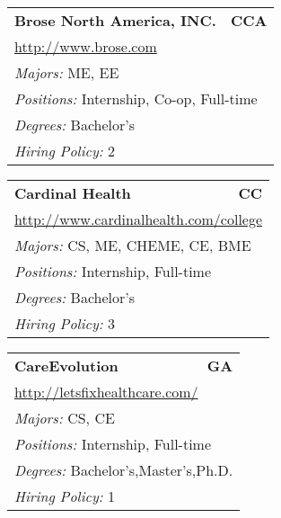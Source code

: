 \documentclass[twoside]{article}
\begin{document}
\begin{center}
\begin{multicols}{3}
\begin{FlushLeft}
\begin{minipage}{.9\columnwidth}
\end{minipage}
 
\begin{minipage}{.9\columnwidth}\begin{tabularx}{.95\columnwidth}{Xr}
                 {\Large\bf Brose North America, INC.} & {\Large\bf CCA}\\
    \multicolumn{2}{p{.95\columnwidth}}{\url{http://www.brose.com}}\\
    \multicolumn{2}{p{.95\columnwidth}}{\emph{Majors:} ME, EE}\\
    \multicolumn{2}{p{.95\columnwidth}}{\emph{Positions:} Internship, Co-op, Full-time}\\
    \multicolumn{2}{p{.95\columnwidth}}{\emph{Degrees:} Bachelor's}\\
    \multicolumn{2}{p{.95\columnwidth}}{\emph{Hiring Policy:} 2}\\
    \end{tabularx}
    
\end{minipage}
 
\begin{minipage}{.9\columnwidth}\begin{tabularx}{.95\columnwidth}{Xr}
                 {\Large\bf Cardinal Health} & {\Large\bf CC}\\
    \multicolumn{2}{p{.95\columnwidth}}{\url{http://www.cardinalhealth.com/college}}\\
    \multicolumn{2}{p{.95\columnwidth}}{\emph{Majors:} CS, ME, CHEME, CE, BME}\\
    \multicolumn{2}{p{.95\columnwidth}}{\emph{Positions:} Internship, Full-time}\\
    \multicolumn{2}{p{.95\columnwidth}}{\emph{Degrees:} Bachelor's}\\
    \multicolumn{2}{p{.95\columnwidth}}{\emph{Hiring Policy:} 3}\\
    \end{tabularx}
    
\end{minipage}
 
\begin{minipage}{.9\columnwidth}\begin{tabularx}{.95\columnwidth}{Xr}
                 {\Large\bf CareEvolution} & {\Large\bf GA}\\
    \multicolumn{2}{p{.95\columnwidth}}{\url{http://letsfixhealthcare.com/}}\\
    \multicolumn{2}{p{.95\columnwidth}}{\emph{Majors:} CS, CE}\\
    \multicolumn{2}{p{.95\columnwidth}}{\emph{Positions:} Internship, Full-time}\\
    \multicolumn{2}{p{.95\columnwidth}}{\emph{Degrees:} Bachelor's,Master's,Ph.D.}\\
    \multicolumn{2}{p{.95\columnwidth}}{\emph{Hiring Policy:} 1}\\
    \end{tabularx}
    

\end{minipage}
\end{FlushLeft}
\end{multicols}
\end{center}
\end{document}
